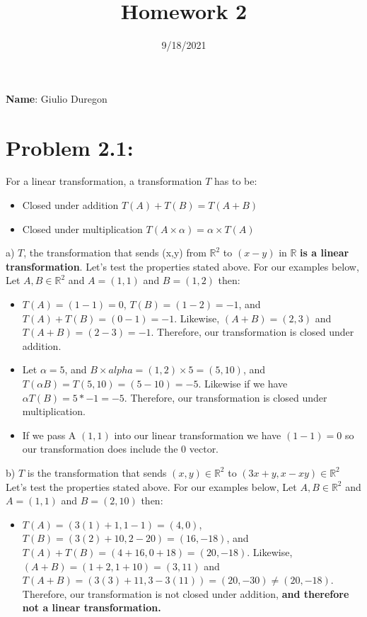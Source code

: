 \documentclass{article}
\title{Homework 2}
\date{9/18/2021}
\begin{document}
\maketitle

\textbf{Name}: Giulio Duregon

\break 


\section{Problem 2.1:}
For a linear transformation, a transformation $T$ has to be:
\begin{itemize}
    \item Closed under addition $T(A)+T(B) = T(A+B)$
    \item Closed under multiplication $T(A\times \alpha) = \alpha \times T(A)$

\end{itemize}
a) $T$, the transformation that sends (x,y) from $\mathbb{R}^2$ to $(x-y)$ in $\mathbb{R}$ \textbf{is a linear transformation}. Let's test the properties stated above. For our examples below, Let $A,B \in \mathbb{R}^2 $ and $A=(1,1)$ and $B=(1,2)$ then:
\begin{itemize}
    \item $T(A)=(1-1)=0$, $T(B)=(1-2)=-1$, and $T(A) + T(B)=(0-1)=-1$. Likewise, $(A+B)=(2,3)$ and $T(A+B)=(2-3) =-1$. Therefore, our transformation is closed under addition.
    \item Let $\alpha =5$, and $B\times alpha = (1,2)\times 5=(5,10)$, and $T(\alpha B)=T(5,10)=(5-10)=-5$. Likewise if we have $\alpha T(B) = 5 * -1 = -5$. Therefore, our transformation is closed under multiplication. 
    \item If we pass A $(1,1)$ into our linear transformation we have $(1-1)=0$ so our transformation does include the 0 vector.
\end{itemize}
\par
b) $T$ is the transformation that sends $(x,y) \in \mathbb{R}^2$ to $(3x+y,x-xy) \in \mathbb{R}^2$ Let's test the properties stated above. For our examples below, Let $A,B \in \mathbb{R}^2 $ and $A=(1,1)$ and $B=(2,10)$ then:
\begin{itemize}
    \item $T(A)=(3(1) + 1, 1 -1)= (4,0)$, $T(B)=(3(2)+10, 2-20)=(16,-18)$, and $T(A) + T(B)=(4+16,0+18)=(20,-18)$. Likewise, $(A+B)=(1+2,1+10)=(3,11)$ and $T(A+B)=(3(3) + 11, 3-3(11)) =(20,-30) \neq (20,-18)$. Therefore, our transformation is not closed under addition, \textbf{and therefore not a linear transformation.}
\end{itemize}
\end{document}
